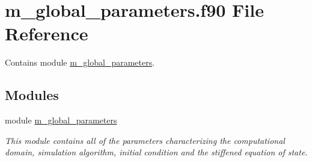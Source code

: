 \hypertarget{m__global__parameters_8f90}{}\section{m\+\_\+global\+\_\+parameters.\+f90 File Reference}
\label{m__global__parameters_8f90}


Contains module \hyperlink{namespacem__global__parameters}{m\+\_\+global\+\_\+parameters}.  


\subsection*{Modules}
\begin{DoxyCompactItemize}
\item 
module \hyperlink{namespacem__global__parameters}{m\+\_\+global\+\_\+parameters}
\begin{DoxyCompactList}\small\item\em This module contains all of the parameters characterizing the computational domain, simulation algorithm, initial condition and the stiffened equation of state. \end{DoxyCompactList}\end{DoxyCompactItemize}

